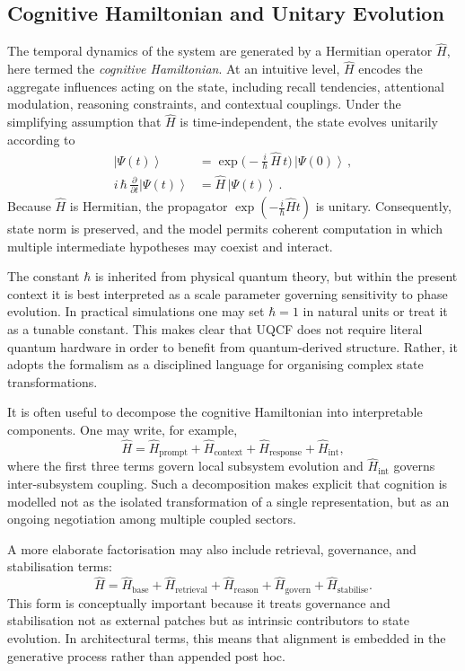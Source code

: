 \documentclass[12pt]{article}
\newcommand{\ket}[1]{\left|#1\right\rangle}
\begin{document}
\subsection{Cognitive Hamiltonian and Unitary Evolution}
The temporal dynamics of the system are generated by a Hermitian operator $\hat{H}$, here termed the \emph{cognitive Hamiltonian}. At an intuitive level, $\hat{H}$ encodes the aggregate influences acting on the state, including recall tendencies, attentional modulation, reasoning constraints, and contextual couplings. Under the simplifying assumption that $\hat{H}$ is time-independent, the state evolves unitarily according to
\begin{align}
\ket{\Psi(t)} &= \exp\!\Big(-\frac{i}{\hbar}\,\hat{H}\,t\Big)\,\ket{\Psi(0)}\,, \label{eq:time-evolution}\\
 i\,\hbar\,\frac{\partial}{\partial t}\ket{\Psi(t)} &= \hat{H}\,\ket{\Psi(t)}\,. \label{eq:schrodinger}
\end{align}
Because $\hat{H}$ is Hermitian, the propagator $\exp(-\tfrac{i}{\hbar}\hat{H}t)$ is unitary. Consequently, state norm is preserved, and the model permits coherent computation in which multiple intermediate hypotheses may coexist and interact.

The constant $\hbar$ is inherited from physical quantum theory, but within the present context it is best interpreted as a scale parameter governing sensitivity to phase evolution. In practical simulations one may set $\hbar = 1$ in natural units or treat it as a tunable constant. This makes clear that UQCF does not require literal quantum hardware in order to benefit from quantum-derived structure. Rather, it adopts the formalism as a disciplined language for organising complex state transformations.

It is often useful to decompose the cognitive Hamiltonian into interpretable components. One may write, for example,
\begin{equation}
\hat{H} = \hat{H}_{\mathrm{prompt}} + \hat{H}_{\mathrm{context}} + \hat{H}_{\mathrm{response}} + \hat{H}_{\mathrm{int}},
\end{equation}
where the first three terms govern local subsystem evolution and $\hat{H}_{\mathrm{int}}$ governs inter-subsystem coupling. Such a decomposition makes explicit that cognition is modelled not as the isolated transformation of a single representation, but as an ongoing negotiation among multiple coupled sectors.

A more elaborate factorisation may also include retrieval, governance, and stabilisation terms:
\begin{equation}
\hat{H} = \hat{H}_{\mathrm{base}} + \hat{H}_{\mathrm{retrieval}} + \hat{H}_{\mathrm{reason}} + \hat{H}_{\mathrm{govern}} + \hat{H}_{\mathrm{stabilise}}.
\end{equation}
This form is conceptually important because it treats governance and stabilisation not as external patches but as intrinsic contributors to state evolution. In architectural terms, this means that alignment is embedded in the generative process rather than appended post hoc.
\end{document}
